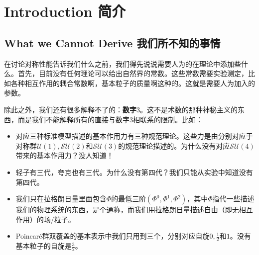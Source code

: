 



\chapter[简介]{Introduction 简介}\label{chap1}

\section[我们所不知的事情]{What we Cannot Derive 我们所不知的事情}\label{sec1.1}

在讨论对称性能告诉我们什么之前，我们得先说说需要人为的在理论中添加些什么。首先，目前没有任何理论可以给出自然界的常数。这些常数需要实验测定，比如各种相互作用的耦合常数啊，基本粒子的质量啊这种的。这就是需要人为加入的参数。

除此之外，我们还有很多解释不了的：{\bfseries 数字$3$}。这不是术数的那种神秘主义的东西，而是我们不能解释所有的直接与数字$3$相联系的限制。比如：

\begin{itemize}
\item 对应三种标准模型描述的基本作用力有三种规范理论。这些力是由分别对应于对称群$\mathcal{U}(1), \mathcal{SU}(2)$和$\mathcal{SU}(3)$的规范理论描述的。为什么没有对应$\mathcal{SU}(4)$带来的基本作用力？没人知道！
\item 轻子有三代，夸克也有三代。为什么没有第四代？我们只能从实验中知道没有第四代。
\item 我们只在拉格朗日量里面包含$\Phi$的最低三阶$(\Phi^0, \Phi^1, \Phi^2)$，其中$\Phi$指代一些描述我们的物理系统的东西，是个通称，而我们用拉格朗日量描述自由（即无相互作用）的场/粒子。
\item Poincaré群双覆盖的基本表示中我们只用到三个，分别对应自旋$0, \tfrac{1}{2}$和$1$。没有基本粒子的自旋是$\tfrac{3}{2}$。
\end{itemize}


